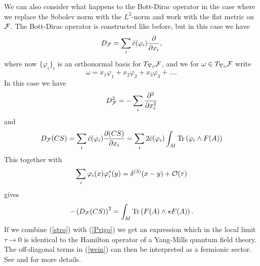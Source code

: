 \documentclass[letterpaper,12pt]{article}
\def\d{\delta}
\def\cf{{\cal F}}
\def\co{{\cal O}}
\newcommand{\pa}{\partial}
\begin{document}
We can also consider what happens to the Bott-Dirac operator in the case where we replace the Sobolev norm with the $L^2$-norm and work with the flat metric on $\cf$. The Bott-Dirac operator is constructed like before, but in this case we have
\begin{equation}
D_\cf =\sum_i \bar{c}(\varphi_i ) \frac{\partial }{\pa x_i } ,
\label{stro}
\end{equation}
where now $\{\varphi_i\}_{i}$ is an orthonormal basis for $T_{\nabla_0} \cf $, and we for $\omega \in T_{\nabla_0} \cf $ write 
$$\omega=x_1\varphi_1+x_2\varphi_2+x_3\varphi_3+\ldots  .$$
In this case we have 
$$D_\cf^2 =-\sum_i \frac{\pa^2}{\pa x_i^2}   $$
and 
\begin{equation}
D_\cf (CS)= \sum_i \bar{c}(\varphi_i) \frac{\pa (CS)}{\pa x_i}= \sum_i  2 \bar{c}(\varphi_i)  \int_M \mbox{Tr}\left(\varphi_i\wedge F(A)  \right)
\label{wein2}
\end{equation}
This together with
$$
\sum_i \varphi_i(x)\varphi_i^*(y) = \d^{(3)}(x-y) + \co(\tau)
$$
gives 
\begin{equation}
 - \left(D_\cf(CS)\right)^2  = \int_M \mbox{Tr}\left( F(A)\wedge \star F(A)\right) .
\label{Prigo}
\end{equation}
If we combine (\ref{stro}) with (\ref{Prigo}) we get an expression which in the local limit $\tau\rightarrow 0$ is identical to the Hamilton operator of a Yang-Mills quantum field theory. The off-diagonal terms in (\ref{wein}) can then be interpreted as a fermionic sector. See \cite{Aastrup:2020jcf} and \cite{Aastrup:2017atr} for more details.
\end{document}
